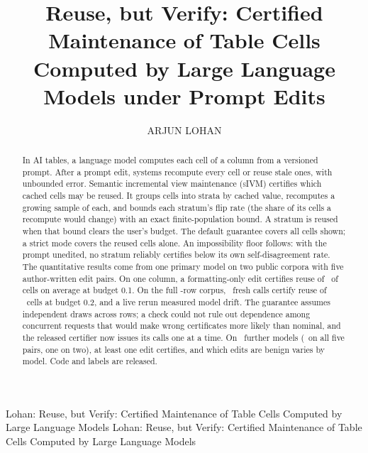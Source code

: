 \documentclass{ieeeaccess}
\let\ieeeaccessclassyear\year
\def\year{2026}
\let\year\ieeeaccessclassyear
\theoremstyle{definition}
\newcommand{\sivm}{\textsc{sIVM}}
\begin{document}

\title{Reuse, but Verify: Certified Maintenance of Table Cells Computed
by Large Language Models under Prompt Edits}

\author{\uppercase{Arjun Lohan}}

\address[1]{University of Southern California, Los Angeles, CA 90089 USA
(e-mail: lohan@usc.edu)}


\markboth
{Lohan: Reuse, but Verify: Certified Maintenance of Table Cells Computed by Large Language Models}
{Lohan: Reuse, but Verify: Certified Maintenance of Table Cells Computed by Large Language Models}


\begin{abstract}
In AI tables, a language model computes each cell of a column from a
versioned prompt. After a prompt edit, systems recompute every cell or
reuse stale ones, with unbounded error. Semantic incremental view
maintenance (\sivm{}) certifies which cached cells may be reused. It
groups cells into strata by cached value, recomputes a growing sample of
each, and bounds each stratum's flip rate (the share of its cells a
recompute would change) with an exact finite-population bound. A stratum
is reused when that bound clears the user's budget. The default
guarantee covers all cells shown; a strict mode covers the reused cells
alone. An impossibility floor follows: with the prompt unedited, no
stratum reliably certifies below its own self-disagreement rate. The
quantitative results come from one primary model on two public corpora
with five author-written edit pairs. On one column, a formatting-only
edit certifies reuse of \frontierB\ of cells on average at budget 0.1.
On the full \deployN-row corpus, \deployOracle\ fresh calls certify
reuse of \deployReused\ cells at budget 0.2, and a live rerun measured
model drift. The guarantee assumes independent draws across rows; a
check could not rule out dependence among concurrent requests that would
make wrong certificates more likely than nominal, and the released
certifier now issues its calls one at a time. On \famCountWord\ further
models (\famFivePairFamiliesWord\ on all five pairs, one on two), at
least one edit certifies, and which edits are benign varies by model. Code and labels are released.
\end{abstract}
\end{document}
